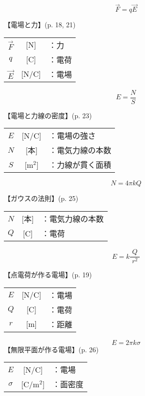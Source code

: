 \documentclass[10pt]{jarticle}
\begin{document}
\newpage
\[
\vec{F} = q \vec{E}
\]


\vskip3mm
\noindent
【電場と力】{\footnotesize (p. 18, 21)}

\begin{tabular}{ccl}
$\vec{F}$	&[N]	&：力 \\
$q$	&[C]	&：電荷 \\
$\vec{E}$	&[N/C]	&：電場
\end{tabular}





\newpage
\[
  E = \frac{N}{S}
\]


\vskip3mm
\noindent
【電場と力線の密度】{\footnotesize (p. 23)}

\begin{tabular}{ccl}
$E$	&[N/C]	&：電場の強さ \\
$N$	&[本]	&：電気力線の本数 \\
$S$	&[m$^2$]	&：力線が貫く面積
\end{tabular}



\newpage
\[
N = 4\pi k Q
\]


\vskip3mm
\noindent
【ガウスの法則】{\footnotesize (p. 25)}

\begin{tabular}{ccl}
$N$	&[本]	&：電気力線の本数 \\
$Q$	&[C]	&：電荷
\end{tabular}






\newpage
\[
E = k \frac{Q}{\; r^2 \;}
\]

\vskip3mm
\noindent
【点電荷が作る電場】{\footnotesize (p. 19)}

\begin{tabular}{ccl}
$E$	&[N/C]	&：電場 \\
$Q$	&[C]	&：電荷 \\
$r$	&[m]	&：距離
\end{tabular}





\newpage
\[
E = 2 \pi k \sigma
\]
\vskip3mm
\noindent
【無限平面が作る電場】{\footnotesize (p. 26)}

\begin{tabular}{ccl}
$E$	&[N/C]	&：電場 \\
$\sigma$	&[C/m$^2$]	&：面密度
\end{tabular}
\end{document}
